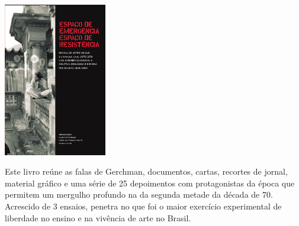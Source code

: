 \begin{center}
\hspace*{-2.5cm}
\hspace*{2cm}\includegraphics[width=45mm]{./imgs/lage.jpeg}
\end{center}

\hspace*{-7cm}\hrulefill\hspace*{-7cm}

\medskip

\noindent{}Este livro reúne as falas de Gerchman, documentos, cartas,
recortes de jornal, material gráfico e uma série de 25 depoimentos com
protagonistas da época que permitem
um mergulho profundo na  da segunda metade da década de 70. Acrescido de 3 ensaios, {} penetra no que foi o maior exercício experimental de liberdade no ensino e na vivência de arte no Brasil.

\hspace{.5cm}
\vfill

\hspace*{-.4cm}\begin{minipage}[c]{1\linewidth}
\small{
{}}
\end{minipage}


\pagebreak
